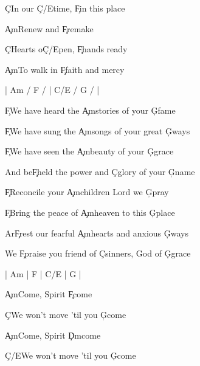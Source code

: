 \documentclass[9pt]{extarticle}
\begin{document}
\bsong

\bc
\c{C}In our \c{C/E}time, \c{F}in this place

\c{Am}Renew and \c{F}remake

\c{C}Hearts o\c{C/E}pen, \c{F}hands ready

\c{Am}To walk in \c{F}faith and mercy
\ec

\bin
|  Am / F /  |  C/E / G /  |
\ein

\bv
\c{F}We have heard the \c{Am}stories of your \c{G}fame

\c{F}We have sung the \c{Am}songs of your great \c{G}ways

\c{F}We have seen the \c{Am}beauty of your \c{G}grace

And be\c{F}held the power and \c{C}glory of your \c{G}name
\ev



\bv
\c{F}Reconcile your \c{Am}children Lord we \c{G}pray

\c{F}Bring the peace of \c{Am}heaven to this \c{G}place

Ar\c{F}rest our fearful \c{Am}hearts and anxious \c{G}ways

We \c{F}praise you friend of \c{C}sinners, God of \c{G}grace
\ev


\bin
| Am | F |  C/E  | G |
\ein

\bb[3]
\c{Am}Come, Spirit \c{F}come

\c{C}We won't move 'til you \c{G}come
\eb

\bb
\c{Am}Come, Spirit \c{Dm}come

\c{C/E}We won't move 'til you \c{G}come
\eb


\esong
\end{document}
